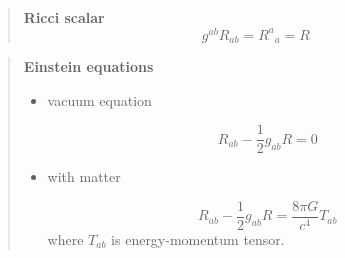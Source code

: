 \begin{quote}
	\textbf{Ricci scalar}
\begin{equation}
g^{ab}R_{ab} = {R^{a}}_{a} = R
\end{equation}

\end{quote}
\begin{quote}
	\textbf{Einstein equations}
\begin{itemize}
	\item vacuum equation

\begin{equation}
R_{ab} - \frac{1}{2} g_{ab}R = 0
\end{equation}


	\item with matter

\begin{equation}
R_{ab} - \frac{1}{2} g_{ab}R = \frac{8\pi G}{c^4} T_{ab}
\end{equation}
where $T_{ab}$ is energy-momentum tensor.
\end{itemize}

\end{quote}
